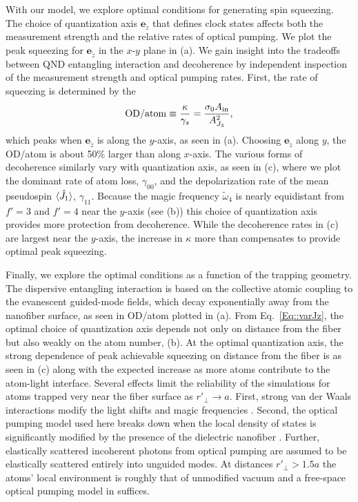 \documentclass[aps,pra,twocolumn]{revtex4-1} %
\newcommand{\jx}{\hat{J}_1}
\newcommand{\qaxis}{\mathbf{e}_{\tilde{z}}}
\newcommand{\magic}[1]{\tilde{\omega}_{#1}}
\begin{document}
With our model, we explore optimal conditions for generating spin squeezing.   The choice of quantization axis $\qaxis$ that defines clock states affects both the measurement strength and the relative rates of optical pumping. We plot the peak squeezing for $\qaxis$ in the $x$-$y$ plane in (a). 
We gain insight into the tradeoffs between QND entangling interaction and decoherence by independent inspection of the measurement strength and optical pumping rates.  
First, the rate of squeezing is determined by the 
\begin{align}\label{Eq::OD/atom}
\mathrm{OD}/\mathrm{atom} \equiv \frac{\kappa}{\gamma_s}=\frac{\sigma_0 A_{\rm in}}{A_{J_3}^2},
\end{align} 
which peaks when $\qaxis$ is along the $y$-axis, as seen in (a). 
Choosing $\qaxis$ along $y$, the OD/atom is about 50\% larger than along $x$-axis.  
The various forms of decoherence similarly vary with quantization axis, as seen in (c), where we plot the dominant rate of atom loss, $\gamma_{00}$, and the depolarization rate of the mean pseudospin $\expt{\jx}$, $\gamma_{11}$. 
Because the magic frequency $\magic{4}$ is nearly equidistant from $f'=3$ and $f'=4$ near the $y$-axis (see (b)) this choice of quantization axis provides more protection from decoherence.   
While the decoherence rates in (c) are largest near the $y$-axis, the increase in $\kappa$ more than compensates to provide optimal peak squeezing.

Finally, we explore the optimal conditions as a function of the trapping geometry.  
The dispersive entangling interaction is based on the collective atomic coupling to the evanescent guided-mode fields, which decay exponentially away from the nanofiber surface, as seen in OD/atom plotted in (a). 
From Eq.~\eqref{Eq::varJz}, the optimal choice of quantization axis depends not only on distance from the fiber but also weakly on the atom number, (b).  
At the optimal quantization axis, the strong dependence of peak achievable squeezing on distance from the fiber is as seen in (c) along with the expected increase as more atoms contribute to the atom-light interface.  
Several effects limit the reliability of the simulations for atoms trapped very near the fiber surface as $r'\!\!_\perp\!\! \rightarrow\! a$. 
First, strong van der Waals interactions modify the light shifts and magic frequencies \cite{vetsch_eugen_optical_2010, lacroute_state-insensitive_2012}.  
Second, the optical pumping model used here breaks down when the local density of states is significantly modified by the presence of the dielectric nanofiber \cite{le_kien_spontaneous_2005, le_kien_scattering_2006}. 
Further, elastically scattered incoherent photons from optical pumping are assumed to be elastically scattered entirely into unguided modes.  At distances $r'\!\!_\perp \!>\! 1.5a$ the atoms' local environment is roughly that of unmodified vacuum \cite{le_kien_spontaneous_2005} and a free-space optical pumping model in  suffices. 
\end{document}
